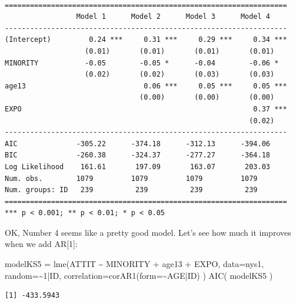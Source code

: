 \documentclass[
  letterpaper,
  DIV=11,
  numbers=noendperiod]{scrreprt}
\newenvironment{Shaded}{\begin{snugshade}}{\end{snugshade}}
\newcommand{\AttributeTok}[1]{\textcolor[rgb]{0.49,0.56,0.16}{#1}}
\newcommand{\DecValTok}[1]{\textcolor[rgb]{0.25,0.63,0.44}{#1}}
\newcommand{\FunctionTok}[1]{\textcolor[rgb]{0.02,0.16,0.49}{#1}}
\newcommand{\NormalTok}[1]{\textcolor[rgb]{0.00,0.44,0.13}{#1}}
\newcommand{\OtherTok}[1]{\textcolor[rgb]{0.00,0.44,0.13}{#1}}
\newcommand{\SpecialCharTok}[1]{\textcolor[rgb]{0.25,0.44,0.63}{#1}}
\begin{document}
\begin{verbatim}

===================================================================
                 Model 1      Model 2      Model 3      Model 4    
-------------------------------------------------------------------
(Intercept)         0.24 ***     0.31 ***     0.29 ***     0.34 ***
                   (0.01)       (0.01)       (0.01)       (0.01)   
MINORITY           -0.05        -0.05 *      -0.04        -0.06 *  
                   (0.02)       (0.02)       (0.03)       (0.03)   
age13                            0.06 ***     0.05 ***     0.05 ***
                                (0.00)       (0.00)       (0.00)   
EXPO                                                       0.37 ***
                                                          (0.02)   
-------------------------------------------------------------------
AIC              -305.22      -374.18      -312.13      -394.06    
BIC              -260.38      -324.37      -277.27      -364.18    
Log Likelihood    161.61       197.09       163.07       203.03    
Num. obs.        1079         1079         1079         1079       
Num. groups: ID   239          239          239          239       
===================================================================
*** p < 0.001; ** p < 0.01; * p < 0.05
\end{verbatim}

OK, Number 4 seems like a pretty good model. Let's see how much it
improves when we add AR{[}1{]}:

\begin{Shaded}
\begin{Highlighting}[]
\NormalTok{modelKS5 }\OtherTok{=} \FunctionTok{lme}\NormalTok{(ATTIT }\SpecialCharTok{\textasciitilde{}}\NormalTok{ MINORITY }\SpecialCharTok{+}\NormalTok{ age13 }\SpecialCharTok{+}\NormalTok{ EXPO, }
              \AttributeTok{data=}\NormalTok{nys1,}
              \AttributeTok{random=}\SpecialCharTok{\textasciitilde{}}\DecValTok{1}\SpecialCharTok{|}\NormalTok{ID,}
              \AttributeTok{correlation=}\FunctionTok{corAR1}\NormalTok{(}\AttributeTok{form=}\SpecialCharTok{\textasciitilde{}}\NormalTok{AGE}\SpecialCharTok{|}\NormalTok{ID) )}
\FunctionTok{AIC}\NormalTok{( modelKS5 )}
\end{Highlighting}
\end{Shaded}

\begin{verbatim}
[1] -433.5943
\end{verbatim}
\end{document}
